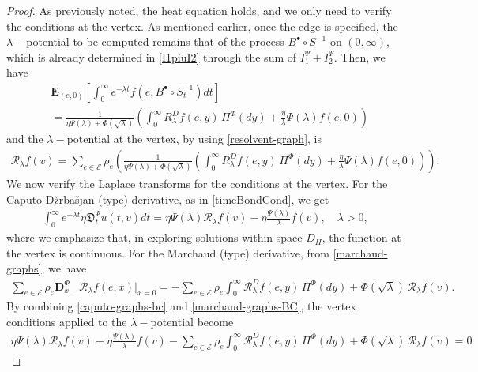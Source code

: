 \documentclass[11pt,a4paper]{article}
\theoremstyle{plain}
\theoremstyle{definition}
\theoremstyle{remark}
\begin{document}
\begin{proof}
			
			As previously noted, the heat equation holds, and we only need to verify the conditions at the vertex. 
			As mentioned earlier, once the edge is specified, the $\lambda-$potential to be computed remains that of the process $B^\bullet\circ {S}^{-1}$ on $(0,\infty)$, which is already determined in \eqref{I1piuI2} through the sum of $I_1^\Psi+ I_2^\Psi$. Then, we have
			\begin{align*}
				&\mathbf{E}_{(e,0)}  \left[\int_0^\infty e^{-\lambda t} f(e, B^\bullet\circ {S}^{-1}_t) dt\right]\\&=\frac{1}{\eta \Psi(\lambda) +\Phi(\sqrt \lambda)} \left( \int_0^\infty R_\lambda^D f(e,y) \, \Pi^\Phi(dy) + \frac{\eta}{\lambda} \Psi(\lambda)f(e,0) \right)
			\end{align*}
			and the $\lambda-$potential at the vertex, by using \eqref{resolvent-graph}, is
			\begin{align*}
				\mathcal{R}_\lambda f(v)= \sum_{e\in \mathcal{E}} \rho_e \left(\frac{1}{\eta \Psi(\lambda) +\Phi(\sqrt \lambda)} \left( \int_0^\infty R_\lambda^D f(e,y) \, \Pi^\Phi(dy) + \frac{\eta}{\lambda} \Psi(\lambda)f(e,0) \right)\right).
			\end{align*}
			We now verify the Laplace transforms for the conditions at the vertex. For the Caputo-D\v{z}rba\v{s}jan (type) derivative, as in \eqref{timeBondCond}, we get
			\begin{align}
				\label{caputo-graphs-bc}
				\int_0^\infty e^{-\lambda t} \eta\mathfrak{D}_t^\Psi u(t,v) dt = \eta \Psi(\lambda) \mathcal{R}_\lambda f(v) - \eta \frac{\Psi(\lambda)}{\lambda} f(v), \quad \lambda>0,
			\end{align}
			where we emphasize that, in exploring solutions within space $D_H$, the function at the vertex is continuous. For the Marchaud (type) derivative, from \eqref{marchaud-graphs}, we have
			\begin{align}
				\label{marchaud-graphs-BC}
				\sum_{e \in \mathcal{E}} \rho_e \mathbf{D}_{x-}^\Phi \mathcal{R}_\lambda f(e,x)\big\vert_{x=0} =-\sum_{e \in \mathcal{E}} \rho_e \int_0^\infty \mathcal{R}_\lambda^D f(e,y)\, \Pi^\Phi(dy) + \Phi(\sqrt{\lambda})\, \mathcal{R}_\lambda f(v).
			\end{align}
			By combining \eqref{caputo-graphs-bc} and \eqref{marchaud-graphs-BC}, the vertex conditions applied to the $\lambda-$potential become
			\begin{align*}
				\eta \Psi(\lambda) \mathcal{R}_\lambda f(v) - \eta \frac{\Psi(\lambda)}{\lambda} f(v) - \sum_{e \in \mathcal{E}} \rho_e \int_0^\infty \mathcal{R}_\lambda^D f(e,y)\, \Pi^\Phi(dy) + \Phi(\sqrt{\lambda})\, \mathcal{R}_\lambda f(v)=0

\end{align*}
\end{proof}
\end{document}
